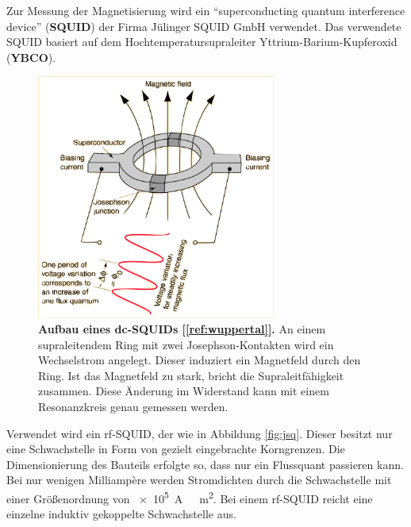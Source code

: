 \documentclass[a4paper,ngerman]{scrartcl}
\begin{document}
Zur Messung der Magnetisierung wird ein "`superconducting quantum interference device"' (\textbf{SQUID}) der Firma Jülinger SQUID GmbH verwendet. 
Das verwendete SQUID basiert auf dem Hochtemperatursupraleiter Yttrium-Barium-Kupferoxid (\textbf{YBCO}).

\begin{figure}[tb!]
\centering
\includegraphics[width=0.7\textwidth]{abbildungen/squide.png}
\caption[Versuchsplatz]{\textbf{Aufbau eines dc-SQUIDs [\ref{ref:wuppertal}].} An einem supraleitendem Ring mit zwei Josephson-Kontakten wird ein Wechselstrom angelegt. 
Dieser induziert ein Magnetfeld durch den Ring. 
Ist das Magnetfeld zu stark, bricht die Supraleitfähigkeit zusammen.
Diese Änderung im Widerstand kann mit einem Resonanzkreis genau gemessen werden.}
\label{fig:squid_wuppertal}
\end{figure}

Verwendet wird ein rf-SQUID, der wie in Abbildung \ref{fig:jsq}. 
Dieser besitzt nur eine Schwachstelle in Form von gezielt eingebrachte Korngrenzen.
Die Dimensionierung des Bauteils erfolgte so, dass nur ein Flussquant passieren kann.
Bei nur wenigen Milliampère werden Stromdichten durch die Schwachstelle mit einer Größenordnung von \SI{e5}{A \per  \centi \square \meter}.
Bei einem rf-SQUID reicht eine einzelne induktiv gekoppelte Schwachstelle aus.
\end{document}
